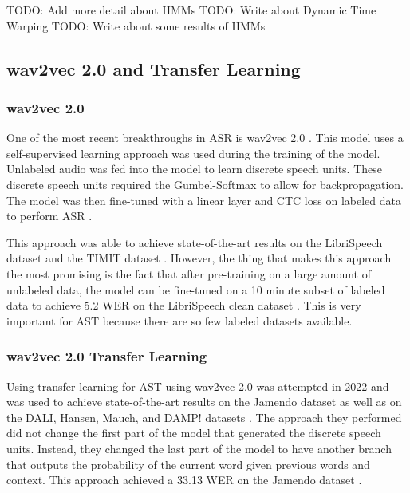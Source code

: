 \documentclass[letterpaper, 12pt]{article}
\begin{document}
\begin{multicols*}{2}
{
\color{red}
TODO: Add more detail about HMMs
TODO: Write about Dynamic Time Warping
TODO: Write about some results of HMMs
}


\subsection{wav2vec 2.0 and Transfer Learning} \label{sec:wav2vec}

\subsubsection{wav2vec 2.0}
One of the most recent breakthroughs in ASR is wav2vec 2.0 \citep{wav2vec}. This model uses a
self-supervised learning approach was used during the training of the model. Unlabeled audio was
fed into the model to learn discrete speech units. These discrete speech units required the
Gumbel-Softmax \citep{gumbelSoftmax} to allow for backpropagation. The model was then
fine-tuned with a linear layer and CTC loss on labeled data to perform ASR \citep{wav2vec}.

This approach was able to achieve state-of-the-art results on the LibriSpeech dataset \citep{Librispeech}
and the TIMIT dataset \citep{TIMIT}. However, the thing that makes this approach the most promising
is the fact that after pre-training on a large amount of unlabeled data, the model can be fine-tuned
on a 10 minute subset of labeled data to achieve 5.2 WER on the LibriSpeech clean dataset \citep{wav2vec}.
This is very important for AST because there are so few labeled datasets available.

\subsubsection{wav2vec 2.0 Transfer Learning}
Using transfer learning for AST using wav2vec 2.0 was attempted in 2022 and was used to achieve
state-of-the-art results on the Jamendo dataset as well as on the DALI, Hansen, Mauch,
and DAMP! datasets \citep{wav2vecTransfer}. The approach they performed did not change the first part
of the model that generated the discrete speech units. Instead, they changed the last part of the
model to have another branch that outputs the probability of the current word given previous words
and context. This approach achieved a 33.13 WER on the Jamendo dataset \citep{wav2vecTransfer}.


\end{multicols*}
\end{document}
